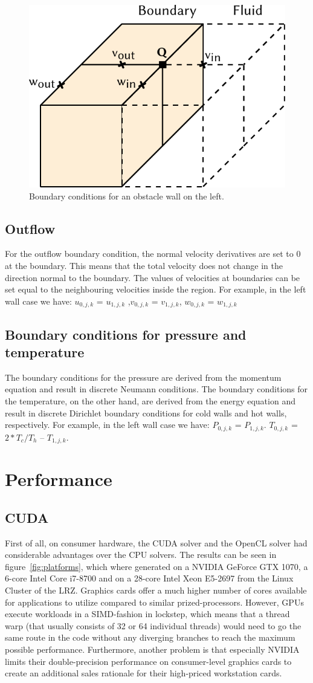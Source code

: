 \documentclass{article}%
\begin{document}
\begin{figure}[htb]
\centering
\includegraphics[width=0.4\linewidth]{images/BoundaryConditions.pdf}
\caption{Boundary conditions for an obstacle wall on the left.}
\label{fig:boundaryConditions}
\end{figure}

\subsection{Outflow}
For the outflow boundary condition, the normal velocity derivatives are set to 0 at the boundary. This means that the total velocity does not change in the direction normal to the boundary. The values of velocities at boundaries can be set equal to the neighbouring velocities inside the region. For example, in the left wall case we have: $u_{0,j,k}$ = $u_{1,j,k}$ ,$v_{0,j,k}$ = $v_{1,j,k}$, $w_{0,j,k}$ = $w_{1,j,k}$
\subsection{Boundary conditions for pressure and temperature}
The boundary conditions for the pressure are derived from the momentum equation and result in discrete Neumann conditions. The boundary conditions for the temperature, on the other hand, are derived from the energy equation and result in discrete Dirichlet boundary conditions for cold walls and hot walls, respectively. For example, in the left wall case we have: $P_{0,j,k}$ = $P_{1,j,k}$.  $T_{0,j,k}$ = $2*T_c/T_h$ – $T_{1,j,k}$.

\section{Performance}
\subsection{CUDA}
First of all, on consumer hardware, the CUDA solver and the OpenCL solver had considerable advantages over the CPU solvers. The results can be seen in figure~\ref{fig:platforms}, which where generated on a NVIDIA GeForce GTX 1070, a 6-core Intel Core i7-8700 and on a 28-core Intel Xeon E5-2697 from the Linux Cluster of the LRZ. Graphics cards offer a much higher number of cores available for applications to utilize compared to similar prized-processors. However, GPUs execute workloads in a SIMD-fashion in lockstep, which means that a thread warp (that usually consists of 32 or 64 individual threads) would need to go the same route in the code without any diverging branches to reach the maximum possible performance. Furthermore, another problem is that especially NVIDIA limits their double-precision performance on consumer-level graphics cards to create an additional sales rationale for their high-priced workstation cards.
\end{document}

